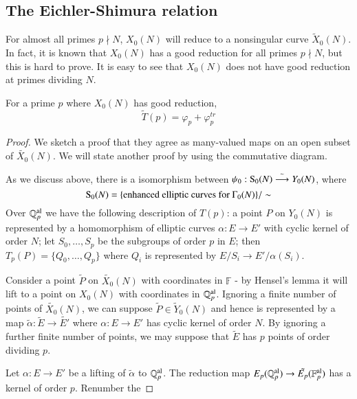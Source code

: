 \documentclass[11pt]{article}
\begin{document}
 \subsection{The Eichler-Shimura relation}
 For almost all primes $p\nmid N$, $X_0(N)$ will reduce to a nonsingular curve $\tilde{X}_0(N)$. In fact, it is known that $X_0(N)$
 has a good reduction for all primes $p\nmid N$, but this is hard to prove. It is easy to see that $X_0(N)$ does not have good reduction
  at primes dividing $N$.
 \begin{theorem}
    For a prime $p$ where $X_0(N)$ has good reduction,
    \begin{equation*}
        \tilde{T}(p)=\varphi_p + \varphi_p^{tr}
    \end{equation*}
 \end{theorem}
\begin{proof}
    We sketch a proof that they agree as many-valued maps on an open subset of $\tilde{X_0}(N)$. We will state another proof
    by using the commutative diagram. \par
    As we discuss above, there is a isomorphism between $\psi_0: {\rm S_0}(N)\stackrel{\sim }{\longrightarrow} Y_0(N)$, where 
    \begin{equation*}
        {\rm S_0}(N)=\{\text{enhanced elliptic curves for $\Gamma_0(N)$}\}/\sim
    \end{equation*} 
    Over $\mathbb{Q}_p^{\rm al}$ we have the following description of $T(p)$: a point $P$ on $Y_0(N)$ is represented by a 
    homomorphism of elliptic curves $\alpha:E\rightarrow E'$ with cyclic kernel of order $N$; let $S_0,\ldots,S_p$ be the 
    subgroups of order $p$ in $E$; then $T_p(P)=\{Q_0,\ldots ,Q_p\}$ where $Q_i$ is represented by $E/S_i \rightarrow E'/\alpha(S_i)$.\par
    Consider a point $\tilde{P}$ on $\tilde{X_0}(N)$ with coordinates in $\mathbb{F}$ - by Hensel's lemma it will lift to a 
    point on $X_0(N)$ with coordinates in $\mathbb{Q}_p^{\rm al}$. Ignoring a finite number of points of $\tilde{X_0}(N)$,
     we can suppose $\tilde{P}\in \tilde{Y}_0(N)$ and hence is represented by a map $\tilde{\alpha}:\tilde{E}\rightarrow \tilde{E'}$
     where $\alpha: E\rightarrow E'$ has cyclic kernel of order $N$. By ignoring a further finite number of points, we 
     may suppose that $\tilde{E}$ has $p$ points of order dividing $p$.\par
     Let $\alpha: E\rightarrow E'$ be a lifting of $\tilde{\alpha}$ to $\mathbb{Q}_p^{\rm al}$. The reduction map 
     $E_p(\mathbb{Q}_p^{\rm al})\rightarrow \tilde{E_p}(\mathbb{F}_p^{\rm al})$ has a kernel of order $p$. Renumber the 

\end{proof}
\end{document}
